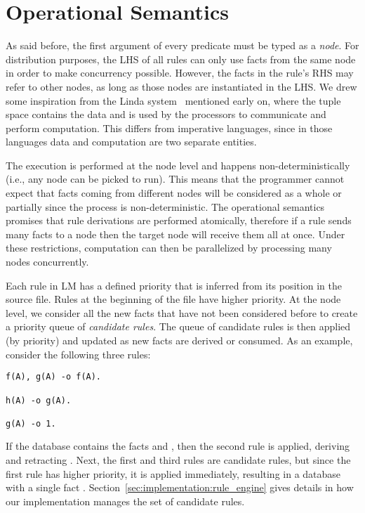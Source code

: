 \section{Operational Semantics}

As said before, the first argument of every predicate must be typed as a
\emph{node}.  For distribution purposes, the LHS of all rules can only use facts
from the same node in order to make concurrency possible. However, the facts in
the rule's RHS may refer to other nodes, as long as those nodes are instantiated
in the LHS. We drew some inspiration from the Linda system~\cite{linda}
mentioned early on, where the tuple space contains the data and is used by the
processors to communicate and perform computation. This differs from imperative
languages, since in those languages data and computation are two separate
entities.

The execution is performed at the node level and happens non-deterministically
(i.e., any node can be picked to run). This means that the programmer cannot
expect that facts coming from different nodes will be considered as a whole or
partially since the process is non-deterministic. The operational semantics
promises that rule derivations are performed atomically, therefore if a rule
sends many facts to a node then the target node will receive them all at once.
Under these restrictions, computation can then be parallelized by processing
many nodes concurrently.

Each rule in LM has a defined priority that is inferred from its position in the
source file.  Rules at the beginning of the file have higher priority. At the
node level, we consider all the new facts that have not been considered before
to create a priority queue of \emph{candidate rules}. The queue of candidate
rules is then applied (by priority) and updated as new facts are derived or
consumed. As an example, consider the following three rules:

\begin{Verbatim}[fontsize=\codesize]
f(A), g(A) -o f(A).

h(A) -o g(A).

g(A) -o 1.
\end{Verbatim}

If the database contains the facts  and , then the
second rule is applied, deriving  and retracting . Next,
the first and third rules are candidate rules, but since the first rule has
higher priority, it is applied immediately, resulting in a database with a
single fact .  Section~\ref{sec:implementation:rule_engine} gives
details in how our implementation manages the set of candidate rules.

